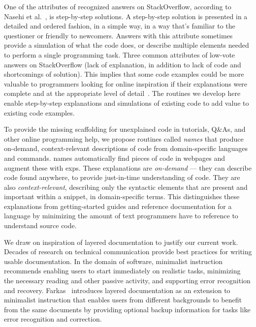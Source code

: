\begin{changes}
One of the attributes of recognized answers on StackOverflow, according to Nasehi et al.~\cite{nasehi_what_2012}, is step-by-step solutions.
A step-by-step solution is presented in a detailed and ordered fashion, in a simple way, in a way that's familiar to the questioner or friendly to newcomers.
Answers with this attribute sometimes provide a simulation of what the code does, or describe multiple elements needed to perform a single programming task. 
Three common attributes of low-vote answers on StackOverflow (lack of explanation, in addition to lack of code and shortcomings of solution).
This implies that some code examples could be more valuable to programmers looking for online inspiration if their explanations were complete and at the appropriate level of detail~\cite{nasehi_what_2012}.
\fi
The routines we develop here enable step-by-step explanations and simulations of existing code to add value to existing code examples.
\end{changes}

To provide the missing scaffolding for unexplained code in tutorials, Q\&As, and other online programming help, we propose routines called \emph{\Glspl{name}} that produce on-demand, context-relevant descriptions of code from domain-specific languages and commands.
\Glspl{name} automatically find pieces of code in webpages and augment these with \glspl{exp}.
These explanations are \emph{on-demand} --- they can describe code found anywhere, to provide just-in-time understanding of code.
They are also \emph{context-relevant}, describing only the syntactic elements that are present and important within a snippet, in domain-specific terms.
This distinguishes these explanations from getting-started guides and reference documentation for a language by minimizing the amount of text programmers have to reference to understand source code.

We draw on inspiration of layered documentation to justify our current work. 
Decades of research on technical communication provide best practices for writing usable documentation.
In the domain of software, minimalist instruction~\cite{carroll_nurnberg_1990} recommends enabling users to start immediately on realistic tasks, minimizing the necessary  reading and other passive activity, and supporting error recognition and recovery.
Farkas~\cite{farkas_layering_1998} introduces layered documentation as an extension to minimalist instruction that enables users from different backgrounds to benefit from the same documents by providing optional backup information for tasks like error recognition and correction.
\fi 

